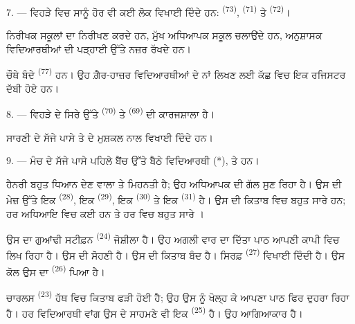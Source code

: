 7. --- ਵਿਹੜੇ ਵਿਚ ਸਾਨੂੰ ਹੋਰ ਵੀ ਕਈ ਲੋਕ ਵਿਖਾਈ ਦਿੰਦੇ ਹਨ: 
\textsuperscript{(73)},  \textsuperscript{(71)} ਤੇ
 \textsuperscript{(72)}।

ਨਿਰੀਖਕ ਸਕੂਲਾਂ ਦਾ ਨਿਰੀਖਣ ਕਰਦੇ ਹਨ, ਮੁੱਖ ਅਧਿਆਪਕ ਸਕੂਲ ਚਲਾਉਂਦੇ ਹਨ, ਅਨੁਸ਼ਾਸਕ
ਵਿਦਿਆਰਥੀਆਂ ਦੀ ਪੜ੍ਹਾਈ ਉੱਤੇ ਨਜ਼ਰ ਰੱਖਦੇ ਹਨ।

ਚੌਥੇ ਬੰਦੇ  \textsuperscript{(77)} ਹਨ। ਉਹ ਗ਼ੈਰ-ਹਾਜ਼ਰ ਵਿਦਿਆਰਥੀਆਂ
ਦੇ ਨਾਂ ਲਿਖਣ ਲਈ ਕੱਛ ਵਿਚ ਇਕ ਰਜਿਸਟਰ ਦੱਬੀ ਹੋਏ ਹਨ।

8. --- ਵਿਹੜੇ ਦੇ ਸਿਰੇ ਉੱਤੇ  \textsuperscript{(70)} ਤੇ
 \textsuperscript{(69)} ਦੀ ਕਾਰਜਸ਼ਾਲਾ ਹੈ।

ਸਾਰਣੀ ਦੇ ਸੱਜੇ ਪਾਸੇ  ਤੇ  ਦੇ 
ਮੁਸ਼ਕਲ ਨਾਲ ਵਿਖਾਈ ਦਿੰਦੇ ਹਨ।


\VUsaut{2.4mm}

\VUsaut{3.0mm}

9. --- ਮੰਚ ਦੇ ਸੱਜੇ ਪਾਸੇ ਪਹਿਲੇ ਬੈਂਚ ਉੱਤੇ ਬੈਠੇ ਵਿਦਿਆਰਥੀ  (*),
 ਤੇ  ਹਨ।

ਹੈਨਰੀ ਬਹੁਤ ਧਿਆਨ ਦੇਣ ਵਾਲਾ ਤੇ ਮਿਹਨਤੀ ਹੈ; ਉਹ ਅਧਿਆਪਕ ਦੀ ਗੱਲ ਸੁਣ ਰਿਹਾ ਹੈ। ਉਸ ਦੀ
ਮੇਜ਼ ਉੱਤੇ ਇਕ  \textsuperscript{(28)}, ਇਕ 
\textsuperscript{(29)}, ਇਕ  \textsuperscript{(30)} ਤੇ ਇਕ
 \textsuperscript{(31)} ਹੈ। ਉਸ ਦੀ ਕਿਤਾਬ ਵਿਚ ਬਹੁਤ ਸਾਰੇ
 ਹਨ; ਹਰ ਅਧਿਆਇ ਵਿਚ ਕਈ  ਹਨ ਤੇ ਹਰ  ਵਿਚ ਬਹੁਤ
ਸਾਰੇ ।

ਉਸ ਦਾ ਗੁਆਂਢੀ ਸਟੀਫ਼ਨ \textsuperscript{(24)} ਜੋਸ਼ੀਲਾ ਹੈ। ਉਹ ਅਗਲੀ ਵਾਰ ਦਾ ਦਿੱਤਾ ਪਾਠ
ਆਪਣੀ ਕਾਪੀ ਵਿਚ ਲਿਖ ਰਿਹਾ ਹੈ। ਉਸ ਦੀ  ਸੋਹਣੀ ਹੈ। ਉਸ ਦੀ ਕਿਤਾਬ ਬੰਦ
ਹੈ। ਸਿਰਫ਼  \textsuperscript{(27)} ਵਿਖਾਈ ਦਿੰਦੀ ਹੈ। ਉਸ ਕੋਲ ਉਸ ਦਾ
 \textsuperscript{(26)} ਪਿਆ ਹੈ।

ਚਾਰਲਸ \textsuperscript{(23)} ਹੱਥ ਵਿਚ ਕਿਤਾਬ ਫੜੀ ਹੋਈ ਹੈ; ਉਹ ਉਸ ਨੂੰ ਖੋਲ੍ਹ ਕੇ ਆਪਣਾ
ਪਾਠ ਫਿਰ ਦੁਹਰਾ ਰਿਹਾ ਹੈ। ਹਰ ਵਿਦਿਆਰਥੀ ਵਾਂਗ ਉਸ ਦੇ ਸਾਹਮਣੇ ਵੀ ਇਕ 
\textsuperscript{(25)} ਹੈ। ਉਹ ਆਗਿਆਕਾਰ ਹੈ।

